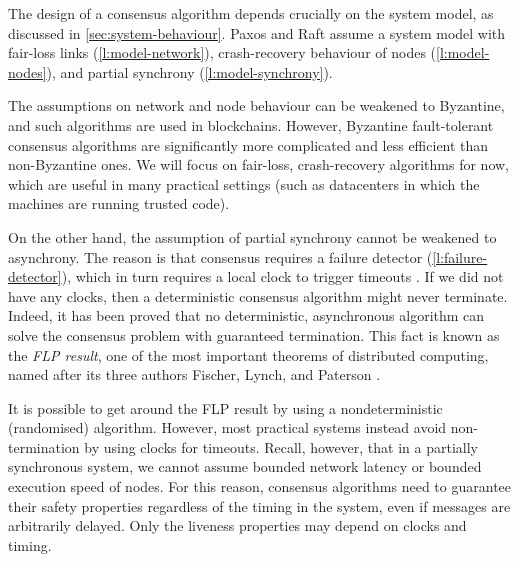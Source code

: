 The design of a consensus algorithm depends crucially on the system model, as discussed in \autoref{sec:system-behaviour}.
Paxos and Raft assume a system model with fair-loss links (\autoref{l:model-network}), crash-recovery behaviour of nodes (\autoref{l:model-nodes}), and partial synchrony (\autoref{l:model-synchrony}).

The assumptions on network and node behaviour can be weakened to Byzantine, and such algorithms are used in blockchains.
However, Byzantine fault-tolerant consensus algorithms are significantly more complicated and less efficient than non-Byzantine ones.
We will focus on fair-loss, crash-recovery algorithms for now, which are useful in many practical settings (such as datacenters in which the machines are running trusted code).

On the other hand, the assumption of partial synchrony cannot be weakened to asynchrony.
The reason is that consensus requires a failure detector (\autoref{l:failure-detector}), which in turn requires a local clock to trigger timeouts \citep{Chandra:1996}.
If we did not have any clocks, then a deterministic consensus algorithm might never terminate.
Indeed, it has been proved that no deterministic, asynchronous algorithm can solve the consensus problem with guaranteed termination.
This fact is known as the \emph{FLP result}, one of the most important theorems of distributed computing, named after its three authors Fischer, Lynch, and Paterson \citep{Fischer:1985}.

It is possible to get around the FLP result by using a nondeterministic (randomised) algorithm.
However, most practical systems instead avoid non-termination by using clocks for timeouts.
Recall, however, that in a partially synchronous system, we cannot assume bounded network latency or bounded execution speed of nodes.
For this reason, consensus algorithms need to guarantee their safety properties regardless of the timing in the system, even if messages are arbitrarily delayed.
Only the liveness properties may depend on clocks and timing.

